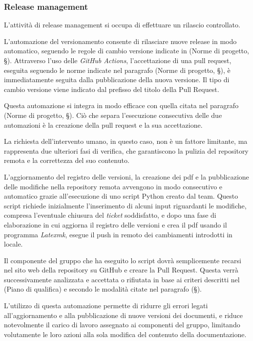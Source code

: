 \documentclass[10pt, a4paper]{article}
\begin{document}
\subsubsection{Release management}
L'attività di release management si occupa di effettuare un rilascio controllato.

L'automazione del versionamento consente di rilasciare nuove release in modo automatico, seguendo le regole di
cambio versione indicate in (Norme di progetto, \S {}). Attraverso l'uso delle \textit{GitHub Actions}, l'accettazione di una pull request, 
eseguita seguendo le norme indicate nel paragrafo (Norme di progetto, \S {}), è immediatamente seguita dalla pubblicazione della nuova versione.
Il tipo di cambio versione viene indicato dal prefisso del titolo della Pull Request.

Questa automazione si integra in modo efficace con quella citata nel paragrafo (Norme di progetto, \S {}).
Ciò che separa l'esecuzione consecutiva delle due automazioni è la creazione della pull request e la sua accettazione.

La richiesta dell'intervento umano, in questo caso, non è un fattore limitante, ma rappresenta due ulteriori fasi di
verifica, che garantiscono la pulizia del repository remota e la correttezza del suo contenuto.

\label{sec:automazione_docs}
L'aggiornamento del registro delle versioni, la creazione dei pdf e la pubblicazione delle modifiche nella repository remota avvengono in modo consecutivo e automatico grazie all'esecuzione di uno script Python creato dal team.
Questo script richiede inizialmente l'inserimento di alcuni input riguardanti le modifiche, compresa l'eventuale chiusura del \textit{ticket} soddisfatto, e dopo una fase di elaborazione
in cui aggiorna il registro delle versioni e crea il pdf usando il programma \textit{Latexmk}, esegue il push in remoto dei cambiamenti introdotti in locale.

Il componente del gruppo che ha eseguito lo script dovrà semplicemente recarsi nel
sito web della repository su GitHub e creare la Pull Request.
Questa verrà successivamente analizzata e accettata o rifiutata in base ai criteri descritti nel (Piano di qualifica) e
secondo le modalità citate nel paragrafo (\S {}).

L'utilizzo di questa automazione permette di ridurre gli errori legati all'aggiornamento e alla pubblicazione di nuove
versioni dei documenti, e riduce notevolmente il carico di lavoro assegnato ai componenti del gruppo, limitando
volutamente le loro azioni alla sola modifica del contenuto della documentazione.
\end{document}
